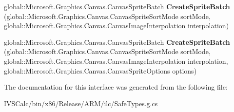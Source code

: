 \begin{DoxyCompactItemize}
global\+::\+Microsoft.\+Graphics.\+Canvas.\+Canvas\+Sprite\+Batch {\bfseries Create\+Sprite\+Batch} (global\+::\+Microsoft.\+Graphics.\+Canvas.\+Canvas\+Sprite\+Sort\+Mode sort\+Mode, global\+::\+Microsoft.\+Graphics.\+Canvas.\+Canvas\+Image\+Interpolation interpolation)
\item 
\mbox{\label{interface_microsoft_1_1_graphics_1_1_canvas_1_1_i_canvas_drawing_session_a3e72f710435d7fa104ce637a9f255634}} 
global\+::\+Microsoft.\+Graphics.\+Canvas.\+Canvas\+Sprite\+Batch {\bfseries Create\+Sprite\+Batch} (global\+::\+Microsoft.\+Graphics.\+Canvas.\+Canvas\+Sprite\+Sort\+Mode sort\+Mode, global\+::\+Microsoft.\+Graphics.\+Canvas.\+Canvas\+Image\+Interpolation interpolation, global\+::\+Microsoft.\+Graphics.\+Canvas.\+Canvas\+Sprite\+Options options)
\end{DoxyCompactItemize}


The documentation for this interface was generated from the following file\+:\begin{DoxyCompactItemize}
\item 
I\+V\+S\+Calc/bin/x86/\+Release/\+A\+R\+M/ilc/Safe\+Types.\+g.\+cs\end{DoxyCompactItemize}
